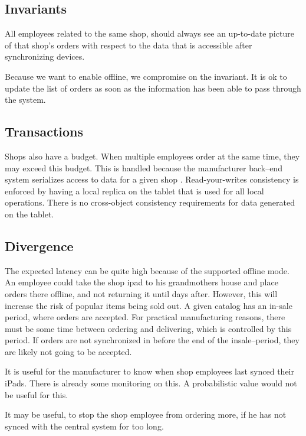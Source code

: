 \documentclass[11pt,a4paper]{report}
\begin{document}
\subsection{Invariants}
All employees related to the same shop, should always see an up-to-date picture of that shop's orders with respect to the data that is accessible after synchronizing devices.

Because we want to enable offline, we compromise on the invariant. It is ok to update the list of orders as soon as the information has been able to pass through the system.

\subsection{Transactions}
Shops also have a budget. When multiple employees order at the same time, they may exceed this budget. This is handled because the manufacturer back--end system serializes access to data for a given shop
.
Read-your-writes consistency is enforced by having a local replica on the tablet that is used for all local operations.
There is no cross-object consistency requirements for data generated on the tablet.
\subsection{Divergence}
The expected latency can be quite high because of the supported offline mode. An employee could take the shop ipad to his grandmothers house and place orders there offline, and not returning it until days after.
However, this will increase the risk of popular items being sold out.
A given catalog has an in-sale period, where orders are accepted. For practical manufacturing reasons, there must be some time between ordering and delivering, which is controlled by this period. If orders are not synchronized in before the end of the insale--period, they are likely not going to be accepted.

It is useful for the manufacturer to know when shop employees last synced their iPads. There is already some monitoring on this. A probabilistic value would not be useful for this.

It may be useful, to stop the shop employee from ordering more, if he has not synced with the central system for too long.
\end{document}
